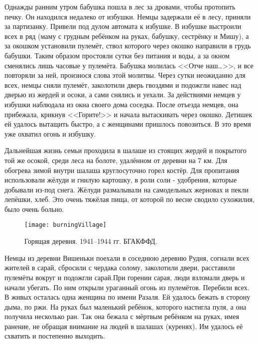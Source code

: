 Однажды ранним утром бабушка пошла в лес за дровами, чтобы протопить печку. Он находился недалеко от избушки. Немцы задержали её в лесу, приняли за партизанку. Привели под дулом автомата к избушке. В избушке выстроили всех в ряд (маму с грудным ребёнком на руках, бабушку, сестрёнку и Мишу), а за окошком установили пулемёт, ствол которого через окошко направили в грудь бабушки. Таким образом простояли сутки без питания и воды, а за окном сменялись лишь часовые у пулемёта. Бабушка молилась <<Отче наш\dots>>, и все повторяли за ней, произнося слова этой молитвы. Через сутки неожиданно для всех, немцы сняли пулемёт, заколотили дверь гвоздями и подожгли навес над дверью из жердей и осоки, а сами снялись и уехали. За действиями немцев у избушки наблюдала из окна своего дома соседка. После отъезда немцев, она прибежала, крикнув <<Горите!>> и начала вытаскивать через окошко. Детишек ей удалось вытащить быстро, а с женщинами пришлось повозиться. В это время уже охватил огонь и избушку.

Дальнейшая жизнь семьи проходила в шалаше из стоящих жердей и покрытого той же осокой, среди леса на болоте, удалённом от деревни на 7 км. Для обогрева зимой внутри шалаша круглосуточно горел костёр. Для пропитания использовали жёлуди и гнилую картошку, в роли соли - удобрения, которые добывали из-под снега. Жёлуди размалывали на самодельных жерновах и пекли лепёшки, хлеб. Это очень тяжёлая пища, от которой по весне сводило сухожилия, было очень больно. 

\begin{wrapfigure}{O}{.4\textwidth}
\centering
\texttt{[image: burningVillage]}
\caption[Горящая деревня. 1941--1944 гг. БГАКФФД.]{Горящая деревня. 1941--1944 гг. БГАКФФД\footnotemark.}
\label{fig:burningVillage}
\end{wrapfigure}

Немцы из деревни Вишеньки поехали в соседнюю деревню Рудня, согнали всех жителей в сарай, сбросили с чердака солому, заколотили двери, расставили пулемёты вокруг и подожгли сарай.При горении сарая, люди взломали дверь и начали убегать. По ним открыли ураганный огонь из пулемётов. Перебили всех. В живых осталась одна женщина по имени Разаля. Ей удалось бежать в сторону дыма, по ржи. На руках был маленький ребёнок, которого настигла пуля, а она получила несколько ран. Так она бежала с мёртвым ребёнком на руках, имея ранение, не обращая внимание на людей в шалашах (куренях). Им удалось её схватить и постепенно выходить. 

